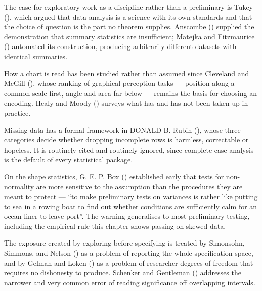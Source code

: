 \documentclass[
  letterpaper,
  10pt,
  twoside,
  openright,
  numbers=noenddot,
  chapterprefix=true]{scrbook}
\begin{document}
\begin{qmiblit}

The case for exploratory work as a discipline rather than a preliminary
is Tukey (), which argued that data
analysis is a science with its own standards and that the choice of
question is the part no theorem supplies. Anscombe
() supplied the demonstration that
summary statistics are insufficient; Matejka and Fitzmaurice
() automated its construction, producing
arbitrarily different datasets with identical summaries.

How a chart is read has been studied rather than assumed since Cleveland
and McGill (), whose ranking of
graphical perception tasks --- position along a common scale first,
angle and area far below --- remains the basis for choosing an encoding.
Healy and Moody () surveys what has and
has not been taken up in practice.

Missing data has a formal framework in DONALD B. Rubin
(), whose three categories decide whether
dropping incomplete rows is harmless, correctable or hopeless. It is
routinely cited and routinely ignored, since complete-case analysis is
the default of every statistical package.

On the shape statistics, G. E. P. Box ()
established early that tests for non-normality are more sensitive to the
assumption than the procedures they are meant to protect --- ``to make
preliminary tests on variances is rather like putting to sea in a rowing
boat to find out whether conditions are sufficiently calm for an ocean
liner to leave port''. The warning generalises to most preliminary
testing, including the empirical rule this chapter shows passing on
skewed data.

The exposure created by exploring before specifying is treated by
Simonsohn, Simmons, and Nelson () as a
problem of reporting the whole specification space, and by Gelman and
Loken () as a problem of researcher
degrees of freedom that requires no dishonesty to produce. Schenker and
Gentleman () addresses the narrower and
very common error of reading significance off overlapping intervals.

\end{qmiblit}
\end{document}
